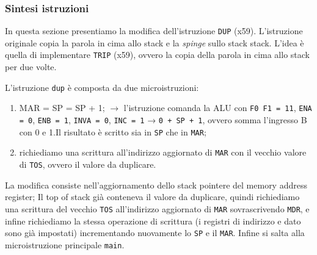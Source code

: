 \subsubsection{Sintesi istruzioni}
In questa sezione presentiamo la modifica dell'istruzione \texttt{DUP} (x59). L'istruzione originale copia la parola in cima allo stack e la \textit{spinge} sullo stack stack. L'idea è quella di implementare \texttt{TRIP} (x59), ovvero la copia della parola in cima allo stack per due volte. 


\noindent
L'istruzione \texttt{dup} è composta da due microistruzioni:

\begin{enumerate}
  \item MAR = SP = SP + 1; $\rightarrow$ l'istruzione comanda la ALU con \texttt{F0 F1 = 11}, \texttt{ENA = 0}, \texttt{ENB = 1}, \texttt{INVA = 0}, \texttt{INC = 1} → \texttt{0 + SP + 1}, ovvero somma l'ingresso B con 0 e 1.Il risultato è scritto sia in \texttt{SP} che in \texttt{MAR};
  \item richiediamo una scrittura all'indirizzo aggiornato di \texttt{MAR} con il vecchio valore di \texttt{TOS}, ovvero il valore da duplicare. 
\end{enumerate}

La modifica consiste nell'aggiornamento dello stack pointere del memory address register; Il top of stack già conteneva il valore da duplicare, quindi richiediamo una scrittura del vecchio \texttt{TOS} all'indirizzo aggiornato di \texttt{MAR} sovrascrivendo \texttt{MDR}, e infine richiediamo la stessa operazione di scrittura (i registri di indirizzo e dato sono già impostati) incrementando nuovamente lo \texttt{SP} e il \texttt{MAR}. Infine si salta alla microistruzione principale \texttt{main}.




